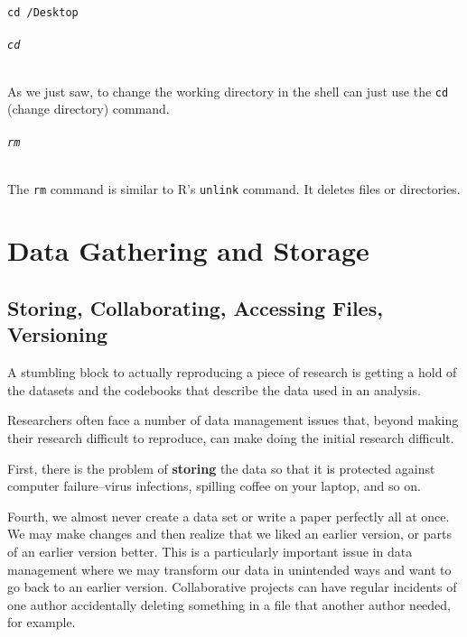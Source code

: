 \documentclass[ChapterTOCs,krantz1]{krantz}\usepackage{graphicx, color}
\makeatletter
\newenvironment{kframe}{%
 \def\at@end@of@kframe{}%
 \ifinner\ifhmode%
  \def\at@end@of@kframe{\end{minipage}}%
  \begin{minipage}{\columnwidth}%
 \fi\fi%
 \def\FrameCommand##1{\hskip\@totalleftmargin \hskip-\fboxsep
 \colorbox{shadecolor}{##1}\hskip-\fboxsep
     \hskip-\linewidth \hskip-\@totalleftmargin \hskip\columnwidth}%
 \MakeFramed {\advance\hsize-\width
   \@totalleftmargin\z@ \linewidth\hsize
   \@setminipage}}%
 {\par\unskip\endMakeFramed%
 \at@end@of@kframe}
\newenvironment{knitrout}{}{} %
\makeatother
\begin{document}
\begin{knitrout}
\color{fgcolor}\begin{kframe}
\begin{alltt}
cd ~/Desktop
\end{alltt}
\end{kframe}
\end{knitrout}


\paragraph{{\tt{cd}}}

As we just saw, to change the working directory in the shell can just use the {\tt{cd}} (change directory) command.

\paragraph{{\tt{rm}}}

The {\tt{rm}} command is similar to R's {\tt{unlink}} command. It deletes files or directories.


\part{Data Gathering and Storage}





\chapter{Storing, Collaborating, Accessing Files, Versioning}\label{Storing}

A stumbling block to actually reproducing a piece of research is getting a hold of the datasets and the codebooks that describe the data used in
an analysis.

Researchers often face a number of data management issues that, beyond
making their research difficult to reproduce, can make doing the initial
research difficult.

First, there is the problem of \textbf{storing} the data so that it is
protected against computer failure--virus infections, spilling coffee on
your laptop, and so on.

Fourth, we almost never create a data set or write a paper perfectly all
at once. We may make changes and then realize that we liked an earlier
version, or parts of an earlier version better. This is a particularly
important issue in data management where we may transform our data in
unintended ways and want to go back to an earlier version. Collaborative
projects can have regular incidents of one author accidentally deleting
something in a file that another author needed, for example.
\end{document}
